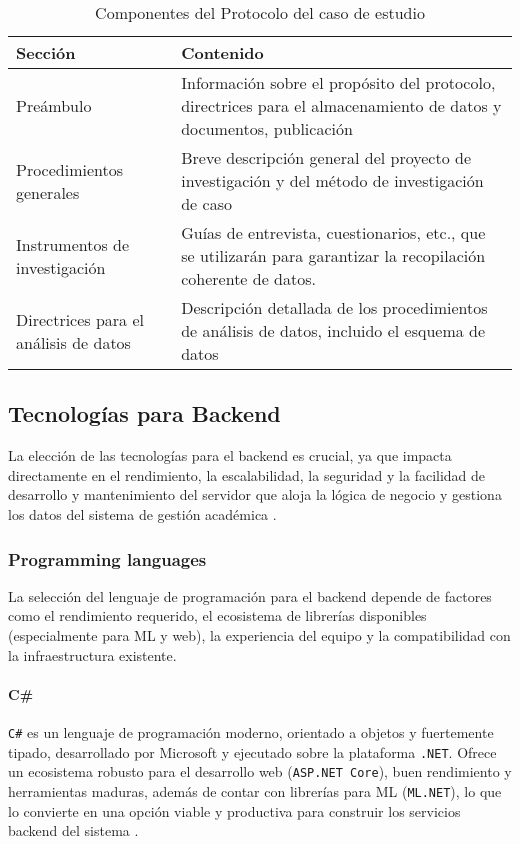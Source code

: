 \begin{longtable}{l|p{3in}}
\caption{Componentes del Protocolo del caso de estudio} \\
\hline
Sección & Contenido \\
\hline
\endfirsthead
Preámbulo & Información sobre el propósito del protocolo, directrices para el almacenamiento de datos y documentos, publicación \\ %
Procedimientos generales & Breve descripción general del proyecto de investigación y del método de investigación de caso \\ %
Instrumentos de investigación & Guías de entrevista, cuestionarios, etc., que se utilizarán para garantizar la recopilación coherente de datos. \\ %
Directrices para el análisis de datos & Descripción detallada de los procedimientos de análisis de datos, incluido el esquema de datos \\ %
\end{longtable}


\subsection{Tecnologías para Backend}
La elección de las tecnologías para el backend es crucial, ya que impacta directamente en el rendimiento, la escalabilidad, la seguridad y la facilidad de desarrollo y mantenimiento del servidor que aloja la lógica de negocio y gestiona los datos del sistema de gestión académica \parencite{FowlerBackend}.

\subsubsection{Programming languages}
La selección del lenguaje de programación para el backend depende de factores como el rendimiento requerido, el ecosistema de librerías disponibles (especialmente para ML y web), la experiencia del equipo y la compatibilidad con la infraestructura existente.

\paragraph{C\#}
\texttt{C\#} es un lenguaje de programación moderno, orientado a objetos y fuertemente tipado, desarrollado por Microsoft y ejecutado sobre la plataforma \texttt{.NET}. Ofrece un ecosistema robusto para el desarrollo web (\texttt{ASP.NET Core}), buen rendimiento y herramientas maduras, además de contar con librerías para ML (\texttt{ML.NET}), lo que lo convierte en una opción viable y productiva para construir los servicios backend del sistema \parencite{MicrosoftCSharp}.

